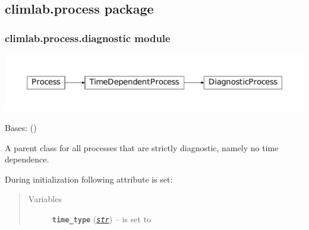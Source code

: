 \documentclass[a4paper,10pt,english]{sphinxmanual}
\begin{document}
\subsection{climlab.process package}
\label{api/climlab.process:climlab-process-package}\label{api/climlab.process::doc}

\subsubsection{climlab.process.diagnostic module}
\label{api/climlab.process:climlab-process-diagnostic-module}
\includegraphics{inheritance-1888e33f5a851ed75afcf967b0ab7f3cd6fbbc2c.pdf}
\label{api/climlab.process:module-climlab.process.diagnostic}

\begin{fulllineitems}
\label{api/climlab.process:climlab.process.diagnostic.DiagnosticProcess}
Bases: {\hyperref[api/climlab.process:climlab.process.time_dependent_process.TimeDependentProcess]{\emph{}}} ()

A parent class for all processes that are strictly diagnostic, namely
no time dependence.

During initialization following attribute is set:
\begin{quote}\begin{description}
\item[{Variables}] \leavevmode
\textbf{\texttt{time\_type}} (\href{http://docs.python.org/2.7/library/functions.html\#str}{\emph{\texttt{str}}}) -- is set to 

\end{description}\end{quote}

\end{fulllineitems}
\end{document}
